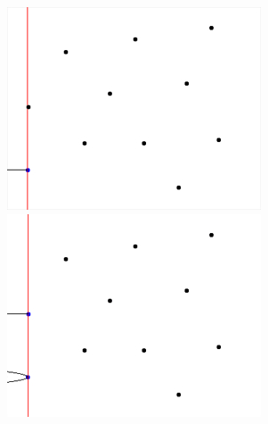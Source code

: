 \begin{figure}[H]
    \begin{center}
        \begin{minipage}[h]{0.3\linewidth}
            \includegraphics[width=1\linewidth]{fortunes-algo-00.jpg}
        \end{minipage}
        \hfill
        \begin{minipage}[h]{0.3\linewidth}
            \includegraphics[width=1\linewidth]{fortunes-algo-01.jpg}
        \end{minipage}
        \hfill
        \begin{minipage}[h]{0.3\linewidth}

\end{minipage}
\end{center}
\end{figure}
